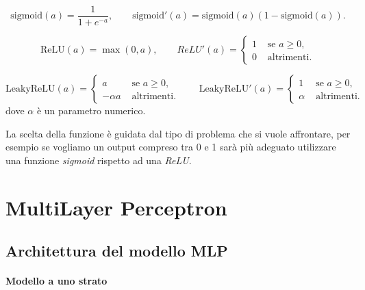 \documentclass[11pt,a4paper,twoside,
openright]{book}
\begin{document}
\begin{equation}
\mathrm{sigmoid}(a) = \frac{1}{1+e^{-a}}, \qquad
\mathrm{sigmoid}'(a) = \mathrm{sigmoid}(a)(1-\mathrm{sigmoid}(a)).
\label{sigmoid}
\end{equation}

\begin{equation}
\mathrm{ReLU}(a) = \max(0,a), \qquad
ReLU'(a) = \begin{cases}
1 &\text{ se } a\geq0, \\
0 &\text{ altrimenti}.
\end{cases}
\label{relu}
\end{equation}

\begin{equation}
\mathrm{LeakyReLU}(a) = \begin{cases}
a &\text{ se } a\geq0, \\
- \alpha a &\text{ altrimenti}.
\end{cases} \qquad
\mathrm{LeakyReLU}'(a) = \begin{cases}
1 &\text{ se } a\geq0, \\
\alpha &\text{ altrimenti}.
\end{cases}
\label{lrelu}
\end{equation}
dove $\alpha$ è un parametro numerico.

La scelta della funzione è guidata dal tipo di problema che si vuole affrontare, per esempio se vogliamo un output compreso tra 0 e 1 sarà più adeguato utilizzare una funzione \textit{sigmoid} rispetto ad una \textit{ReLU}.



\section{MultiLayer Perceptron}
\subsection{Architettura del modello MLP}
\paragraph{Modello a uno strato}
\def\layersep{2.5cm}
\end{document}
